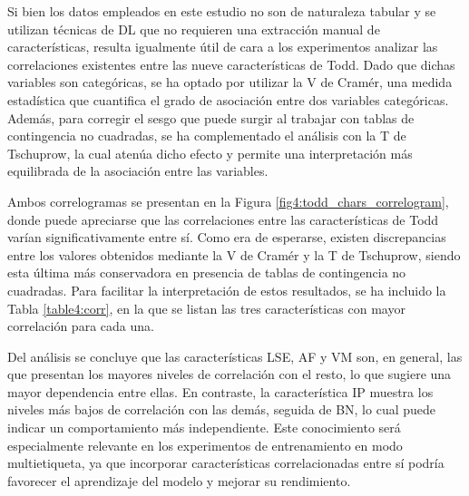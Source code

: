 Si bien los datos empleados en este estudio no son de naturaleza tabular y se utilizan técnicas de DL que no requieren una extracción manual de características, resulta igualmente útil de cara a los experimentos analizar las correlaciones existentes entre las nueve características de Todd. Dado que dichas variables son categóricas, se ha optado por utilizar la V de Cramér, una medida estadística que cuantifica el grado de asociación entre dos variables categóricas. Además, para corregir el sesgo que puede surgir al trabajar con tablas de contingencia no cuadradas, se ha complementado el análisis con la T de Tschuprow, la cual atenúa dicho efecto y permite una interpretación más equilibrada de la asociación entre las variables.

Ambos correlogramas se presentan en la Figura \ref{fig4:todd_chars_correlogram}, donde puede apreciarse que las correlaciones entre las características de Todd varían significativamente entre sí. Como era de esperarse, existen discrepancias entre los valores obtenidos mediante la V de Cramér y la T de Tschuprow, siendo esta última más conservadora en presencia de tablas de contingencia no cuadradas. Para facilitar la interpretación de estos resultados, se ha incluido la Tabla \ref{table4:corr}, en la que se listan las tres características con mayor correlación para cada una.

Del análisis se concluye que las características LSE, AF y VM son, en general, las que presentan los mayores niveles de correlación con el resto, lo que sugiere una mayor dependencia entre ellas. En contraste, la característica IP muestra los niveles más bajos de correlación con las demás, seguida de BN, lo cual puede indicar un comportamiento más independiente. Este conocimiento será especialmente relevante en los experimentos de entrenamiento en modo multietiqueta, ya que incorporar características correlacionadas entre sí podría favorecer el aprendizaje del modelo y mejorar su rendimiento.

